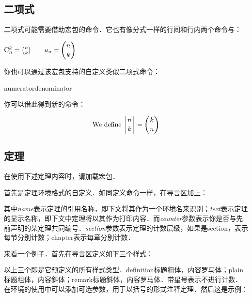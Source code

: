 \subsection{二项式}
\label{subsec:binom}
二项式可能需要借助宏包的命令．它也有像分式一样的行间和行内两个命令与：

\begin{codeshow}
$\mathrm{C}_n^k=\binom{n}{k}
\qquad a_n=\dbinom{n}{k}$
\end{codeshow}

你也可以通过该宏包支持的自定义类似二项式命令：
\begin{latex}
{numerator}{denominator}
\newcommand{\Bfrac}[2]{\genfrac{[}{]}{0pt}{}{#1}{#2}}
\end{latex}

你可以借此得到新的命令：
\begin{codeshow}
\[\text{We define } \Bfrac{n}{k} = \binom{k}{n}\]
\end{codeshow}

\subsection{定理}
在使用下述定理内容时，请加载宏包．

首先是定理环境格式的自定义．如同定义命令一样，在导言区加上：
\begin{latex}
\newtheorem{envname}[counter]{text}[section]
\end{latex}

其中\textit{name}表示定理的引用名称，即下文将其作为一个环境名来识别；\textit{text}表示定理的显示名称，即下文中定理将以其作为打印内容．而\textit{counter}参数表示你是否与先前声明的某定理共同编号．\textit{section}参数表示定理的计数层级，如果是section，表示每节分别计数；chapter表示每章分别计数．

来看一个例子．首先在导言区定义如下三个样式：
\begin{latex}
\theoremstyle{definition}\newtheorem{laws}{Law}[section]
\theoremstyle{plain}\newtheorem{ju}[laws]{Jury}
\theoremstyle{remark}\newtheorem*{marg}{Margaret}
\end{latex}

以上三个即是它预定义的所有样式类型．definition标题粗体，内容罗马体；plain标题粗体，内容斜体；remark标题斜体，内容罗马体．带星号表示不进行计数．在环境的使用中可以添加可选参数，用于以括号的形式注释定理．然后这是示例：

